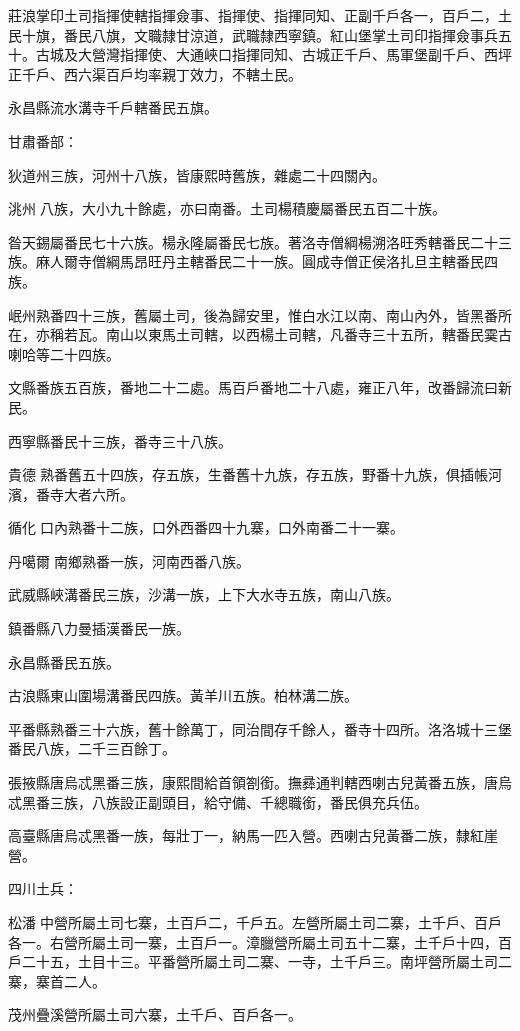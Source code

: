 \begin{pinyinscope}
莊浪掌印土司指揮使轄指揮僉事、指揮使、指揮同知、正副千戶各一，百戶二，土民十旗，番民八旗，文職隸甘涼道，武職隸西寧鎮。紅山堡掌土司印指揮僉事兵五十。古城及大營灣指揮使、大通峽口指揮同知、古城正千戶、馬軍堡副千戶、西坪正千戶、西六渠百戶均率親丁效力，不轄土民。

永昌縣流水溝寺千戶轄番民五旗。

甘肅番部：

狄道州三族，河州十八族，皆康熙時舊族，雜處二十四關內。

洮州八族，大小九十餘處，亦曰南番。土司楊積慶屬番民五百二十族。

昝天錫屬番民七十六族。楊永隆屬番民七族。著洛寺僧綱楊溯洛旺秀轄番民二十三族。麻人爾寺僧綱馬昂旺丹主轄番民二十一族。圓成寺僧正侯洛扎旦主轄番民四族。

岷州熟番四十三族，舊屬土司，後為歸安里，惟白水江以南、南山內外，皆黑番所在，亦稱若瓦。南山以東馬土司轄，以西楊土司轄，凡番寺三十五所，轄番民霙古喇哈等二十四族。

文縣番族五百族，番地二十二處。馬百戶番地二十八處，雍正八年，改番歸流曰新民。

西寧縣番民十三族，番寺三十八族。

貴德熟番舊五十四族，存五族，生番舊十九族，存五族，野番十九族，俱插帳河濱，番寺大者六所。

循化口內熟番十二族，口外西番四十九寨，口外南番二十一寨。

丹噶爾南鄉熟番一族，河南西番八族。

武威縣峽溝番民三族，沙溝一族，上下大水寺五族，南山八族。

鎮番縣八力曼插漢番民一族。

永昌縣番民五族。

古浪縣東山圍場溝番民四族。黃羊川五族。柏林溝二族。

平番縣熟番三十六族，舊十餘萬丁，同治間存千餘人，番寺十四所。洛洛城十三堡番民八族，二千三百餘丁。

張掖縣唐烏忒黑番三族，康熙間給首領劄銜。撫彞通判轄西喇古兒黃番五族，唐烏忒黑番三族，八族設正副頭目，給守備、千總職銜，番民俱充兵伍。

高臺縣唐烏忒黑番一族，每壯丁一，納馬一匹入營。西喇古兒黃番二族，隸紅崖營。

四川土兵：

松潘中營所屬土司七寨，土百戶二，千戶五。左營所屬土司二寨，土千戶、百戶各一。右營所屬土司一寨，土百戶一。漳臘營所屬土司五十二寨，土千戶十四，百戶二十五，土目十三。平番營所屬土司二寨、一寺，土千戶三。南坪營所屬土司二寨，寨首二人。

茂州疊溪營所屬土司六寨，土千戶、百戶各一。


\end{pinyinscope}
